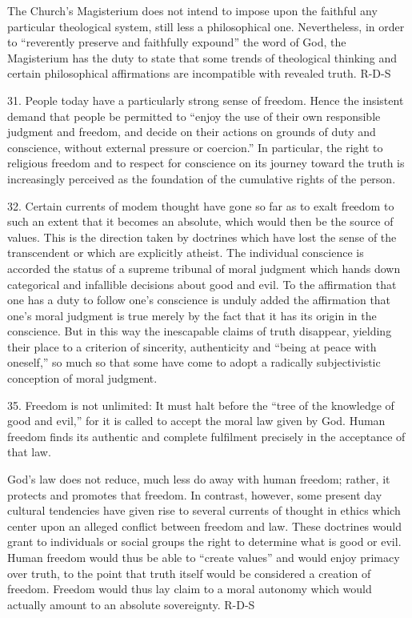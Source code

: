 \documentclass[oneside]{book}
\begin{document}
The Church's Magisterium does not intend to impose upon the faithful any
particular theological system, still less a philosophical one. Nevertheless, in
order to ``reverently preserve and faithfully expound'' the word of God, the
Magisterium has the duty to state that some trends of theological thinking and
certain philosophical affirmations are incompatible with revealed truth.
R-D-S

31. People today have a particularly strong sense of freedom. Hence the
insistent demand that people be permitted to ``enjoy the use of their own
responsible judgment and freedom, and decide on their actions on grounds of duty
and conscience, without external pressure or coercion.'' In particular, the
right to religious freedom and to respect for conscience on its journey toward
the truth is increasingly perceived as the foundation of the cumulative rights
of the person.

32. Certain currents of modem thought have gone so far as to exalt freedom to
such an extent that it becomes an absolute, which would then be the source of
values. This is the direction taken by doctrines which have lost the sense of
the transcendent or which are explicitly atheist. The individual conscience is
accorded the status of a supreme tribunal of moral judgment which hands down
categorical and infallible decisions about good and evil. To the affirmation
that one has a duty to follow one's conscience is unduly added the affirmation
that one's moral judgment is true merely by the fact that it has its origin in
the conscience. But in this way the inescapable claims of truth disappear,
yielding their place to a criterion of sincerity, authenticity and ``being at
peace with oneself,'' so much so that some have come to adopt a radically
subjectivistic conception of moral judgment.

35. Freedom is not unlimited: It must halt before the ``tree of the knowledge of
good and evil,'' for it is called to accept the moral law given by God. Human
freedom finds its authentic and complete fulfilment precisely in the acceptance
of that law.

God's law does not reduce, much less do away with human freedom; rather, it
protects and promotes that freedom. In contrast, however, some present day
cultural tendencies have given rise to several currents of thought in ethics
which center upon an alleged conflict between freedom and law. These doctrines
would grant to individuals or social groups the right to determine what is good
or evil. Human freedom would thus be able to ``create values'' and would enjoy
primacy over truth, to the point that truth itself would be considered a
creation of freedom. Freedom would thus lay claim to a moral autonomy which
would actually amount to an absolute sovereignty.
R-D-S
\end{document}

